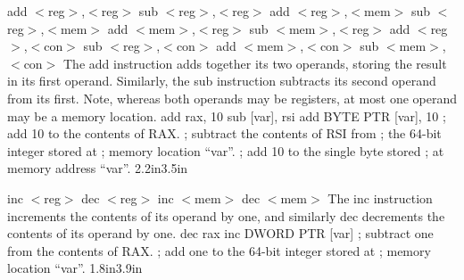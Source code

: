 {add $<$reg$>$,$<$reg$>$ \hspace{0.5in} sub $<$reg$>$,$<$reg$>$ \newline
add $<$reg$>$,$<$mem$>$ \hspace{0.5in} sub $<$reg$>$,$<$mem$>$ \newline
add $<$mem$>$,$<$reg$>$ \hspace{0.5in} sub $<$mem$>$,$<$reg$>$ \newline
add $<$reg$>$,$<$con$>$ \hspace{0.5in} sub $<$reg$>$,$<$con$>$ \newline
add $<$mem$>$,$<$con$>$ \hspace{0.5in} sub $<$mem$>$,$<$con$>$}
{The add instruction adds together its two operands, storing the
  result in its first operand. Similarly, the sub instruction
  subtracts its second operand from its first.  Note, whereas both
  operands may be registers, at most one operand may be a memory
  location.}
{add rax, 10\newline 
sub [var], rsi\newline\newline\newline
add BYTE PTR [var], 10}
{; add 10 to the contents of RAX. \newline
; subtract the contents of RSI from \newline
; the 64-bit integer stored at \newline
; memory location ``var''.\newline
; add 10 to the single byte stored\newline
; at memory address ``var''.\newline}
{2.2in}{3.5in}

{inc $<$reg$>$ \hspace{0.5in} dec $<$reg$>$\newline
inc $<$mem$>$ \hspace{0.5in} dec $<$mem$>$}
{The inc instruction increments the contents of its operand by one,
  and similarly dec decrements the contents of its operand by one.}
{dec rax \newline inc DWORD PTR [var]}
{; subtract one from the contents of RAX. \newline
; add one to the 64-bit integer stored at \newline
; memory location ``var''.}
{1.8in}{3.9in}

